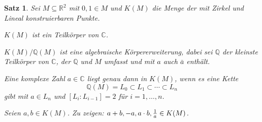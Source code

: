 \documentclass[a4paper,10pt,german]{scrbook}
\theoremstyle{saetze}
\newtheorem{Satz}{Satz}
\theoremstyle{definitionen}
\begin{document}
\begin{Satz}
Sei $M\subseteq \mathbb R^2$ mit $0,1\in M$ und $K(M)$ die Menge der mit Zirkel und Lineal konstruierbaren Punkte.
\begin{enum}
\item $K(M)$ ist ein Teilkörper von $\mathbb C$.
\item $K(M)/\mathbb Q(M)$ ist eine algebraische Körpererweiterung, dabei sei $\mathbb Q$ der kleinste Teilkörper von $\mathbb C$, der $\mathbb Q$ und $M$ umfasst und mit $a$ auch $\bar a$ enthält.
\item Eine komplexe Zahl $a\in \mathbb C$ liegt genau dann in $K(M)$, wenn es eine Kette
\[
\mathbb Q(M) = L_0\subset L_1\subset \cdots \subset L_n
\]
gibt mit $a\in L_n$ und $[L_i:L_{i-1}]=2$ für $i=1,\ldots,n$.
\end{enum}

\bew{} {
\item 
Seien $a,b \in K(M)$. Zu zeigen: $a+b, -a, a \cdot b, \frac{1}{a} \in
K(M)$.

}
\end{Satz}
\end{document}
